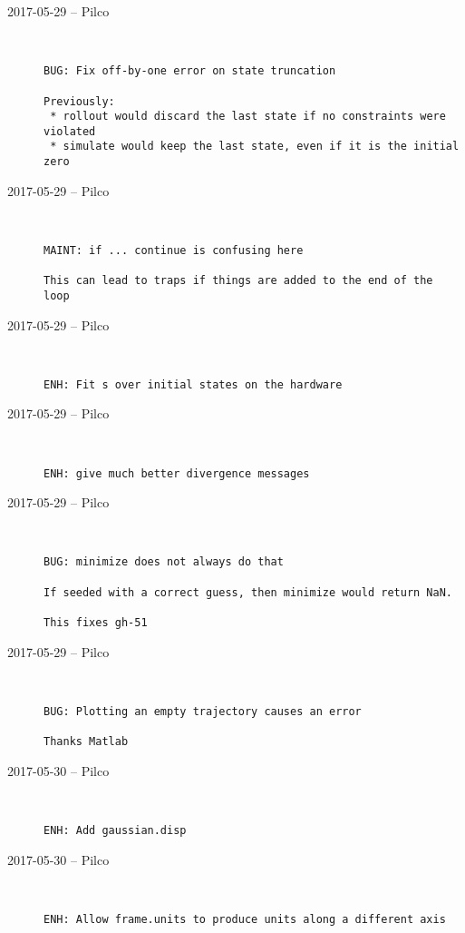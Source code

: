 \begin{description}
  \item[2017-05-29 -- Pilco] \hfill \
\begin{lstlisting}
BUG: Fix off-by-one error on state truncation

Previously:
 * rollout would discard the last state if no constraints were violated
 * simulate would keep the last state, even if it is the initial zero
\end{lstlisting}


  \item[2017-05-29 -- Pilco] \hfill \
\begin{lstlisting}
MAINT: if ... continue is confusing here

This can lead to traps if things are added to the end of the loop
\end{lstlisting}


  \item[2017-05-29 -- Pilco] \hfill \
\begin{lstlisting}
ENH: Fit s over initial states on the hardware
\end{lstlisting}


  \item[2017-05-29 -- Pilco] \hfill \
\begin{lstlisting}
ENH: give much better divergence messages
\end{lstlisting}


  \item[2017-05-29 -- Pilco] \hfill \
\begin{lstlisting}
BUG: minimize does not always do that

If seeded with a correct guess, then minimize would return NaN.

This fixes gh-51
\end{lstlisting}


  \item[2017-05-29 -- Pilco] \hfill \
\begin{lstlisting}
BUG: Plotting an empty trajectory causes an error

Thanks Matlab
\end{lstlisting}


  \item[2017-05-30 -- Pilco] \hfill \
\begin{lstlisting}
ENH: Add gaussian.disp
\end{lstlisting}


  \item[2017-05-30 -- Pilco] \hfill \
\begin{lstlisting}
ENH: Allow frame.units to produce units along a different axis
\end{lstlisting}


\end{description}
